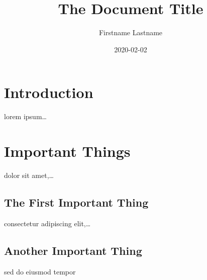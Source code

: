 \documentclass[a4, 11pt]{article}
\title{The Document Title}
\author{Firstname Lastname}
\date{2020-02-02}
\begin{document}
\maketitle

\section{Introduction}
lorem ipsum\dots

\section{Important Things}
dolor sit amet,\dots

\subsection{The First Important Thing}
consectetur adipiscing elit,\dots

\subsection{Another Important Thing}
sed do eiusmod tempor 
\end{document}
